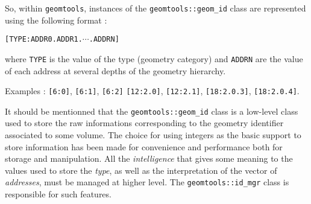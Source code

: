 \pn    So,    within     \texttt{geomtools},    instances    of    the
\texttt{geomtools::geom\_id} class are represented using the following
format :
\begin{center}
\verb+[TYPE:ADDR0.ADDR1.+$\cdots$\verb+.ADDRN]+
\end{center}
\pn where \verb+TYPE+ is the value of the type (geometry category) and
\verb+ADDRN+ are  the value of each  address at several  depths of the
geometry hierarchy.

\pn Examples : \verb+[6:0]+,  \verb+[6:1]+, \verb+[6:2]+
\verb+[12:2.0]+, \verb+[12:2.1]+, \verb+[18:2.0.3]+, \verb+[18:2.0.4]+.

\pn  It  should be  mentionned  that the  \texttt{geomtools::geom\_id}
class  is  a  low-level  class  used to  store  the  raw  informations
corresponding to  the geometry  identifier associated to  some volume.
The  choice  for  using  integers   as  the  basic  support  to  store
information  has been made  for convenience  and performance  both for
storage and  manipulation.  All  the \emph{intelligence} that  gives some
meaning to  the values used to  store the \emph{type}, as  well as the
interpretation of  the vector of \emph{addresses}, must  be managed at
higher  level.  The  \texttt{geomtools::id\_mgr} class  is responsible
for such features.

